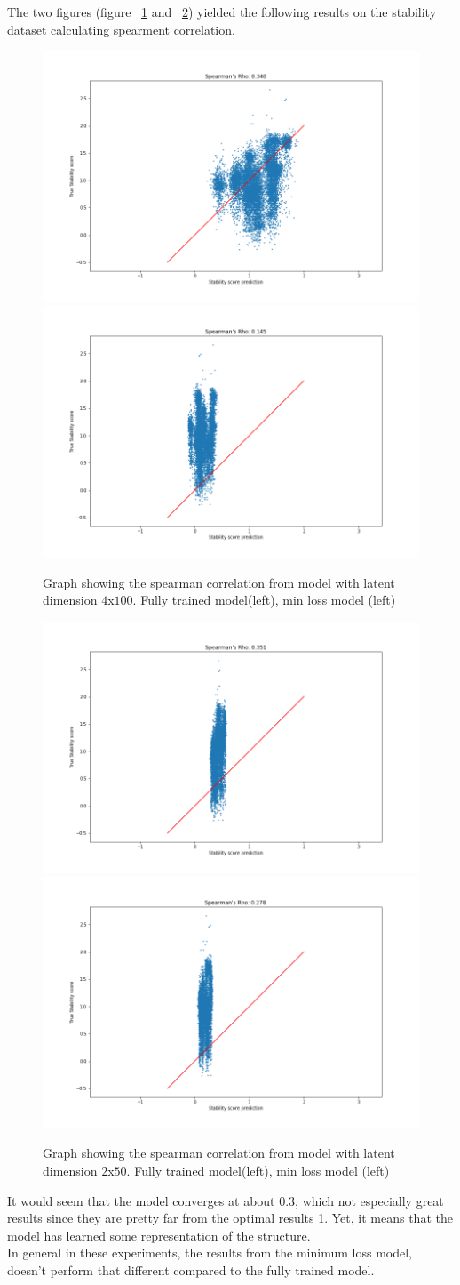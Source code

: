 \noindent
The two figures (figure ~\ref{fig:stab_100} and ~\ref{fig:stab_50}) yielded the following results on the stability dataset calculating spearment correlation.


\begin{figure}[!ht]
  \centering
  \includegraphics[width=0.4\linewidth]{latex/imgs/CNN_spearman_correlation_100_fully.png}
  \includegraphics[width=0.4\linewidth]{latex/imgs/CNN_spearman_correlation_100_best.png}
  \caption{Graph showing the spearman correlation from model with latent dimension $4$x$100$. Fully trained model(left), min loss model (left)}
  \label{fig:stab_100}
\end{figure}

\begin{figure}[!ht]
  \centering
  \includegraphics[width=0.4\linewidth]{latex/imgs/CNN_spearman_correlation_50_fully.png}
  \includegraphics[width=0.4\linewidth]{latex/imgs/CNN_spearman_correlation_50_best.png}
  \caption{Graph showing the spearman correlation from model with latent dimension $2$x$50$. Fully trained model(left), min loss model (left)}
  \label{fig:stab_50}
\end{figure}

\noindent
It would seem that the model converges at about 0.3, which not especially great results since they are pretty far from the optimal results 1. Yet, it means that the model has learned some representation of the structure. \\

\noindent
In general in these experiments, the results from the minimum loss model, doesn't perform that different compared to the fully trained model.